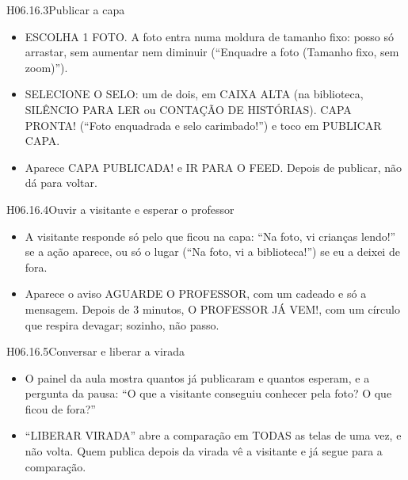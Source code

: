 \begin{historia}{H06.16.3}{Publicar a capa}{\pronto}
\aceite
\begin{itemize}
  \item ESCOLHA 1 FOTO. A foto entra numa moldura de tamanho fixo: posso só
    arrastar, sem aumentar nem diminuir (\enquote{Enquadre a foto (Tamanho
    fixo, sem zoom)}).
  \item SELECIONE O SELO: um de dois, em CAIXA ALTA (na biblioteca, SILÊNCIO
    PARA LER ou CONTAÇÃO DE HISTÓRIAS). CAPA PRONTA! (\enquote{Foto enquadrada
    e selo carimbado!}) e toco em PUBLICAR CAPA.
  \item Aparece CAPA PUBLICADA! e IR PARA O FEED. Depois de publicar, não dá
    para voltar.
\end{itemize}
\end{historia}

\begin{historia}{H06.16.4}{Ouvir a visitante e esperar o professor}{\pronto}
\aceite
\begin{itemize}
  \item A visitante responde só pelo que ficou na capa: \enquote{Na foto, vi
    crianças lendo!} se a ação aparece, ou só o lugar (\enquote{Na foto, vi a
    biblioteca!}) se eu a deixei de fora.
  \item Aparece o aviso AGUARDE O PROFESSOR, com um cadeado e só a
    mensagem. Depois de 3 minutos, O PROFESSOR JÁ VEM!, com um círculo que
    respira devagar; sozinho, não passo.
\end{itemize}
\end{historia}

\begin{historia}{H06.16.5}{Conversar e liberar a virada}{\pronto}
\aceite
\begin{itemize}
  \item O painel da aula mostra quantos já publicaram e quantos esperam, e a
    pergunta da pausa: \enquote{O que a visitante conseguiu conhecer pela
    foto? O que ficou de fora?}
  \item \enquote{LIBERAR VIRADA} abre a comparação em TODAS as telas de uma
    vez, e não volta. Quem publica depois da virada vê a visitante e já
    segue para a comparação.
\end{itemize}
\end{historia}

